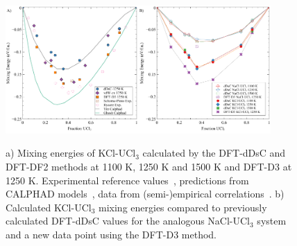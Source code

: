 \documentclass[preprint,3p,10pt,number,sort&compress]{elsarticle}
\begin{document}
\begin{figure}[h!]
\centering
\includegraphics[width=0.45\textwidth]{ben_fig2a.pdf}\includegraphics[width=0.45\textwidth]{ben_fig2b.pdf}
\caption{a) Mixing energies of KCl-UCl$_3$ calculated by the DFT-dDsC and DFT-DF2 methods at 1100 K, 1250 K and 1500 K and DFT-D3 at 1250 K. Experimental reference values~\cite{Rycerz}, predictions from CALPHAD models~\cite{YIN2020,Ghosh}, data from (semi-)empirical correlations~\cite{Pinto}. b) Calculated KCl-UCl$_3$ mixing energies compared to previously calculated DFT-dDsC values for the analogous NaCl-UCl$_3$ system~\cite{Andersson} and a new data point using the DFT-D3 method. }
\label{fig:KCl_UCl3_energy}
\end{figure}
\end{document}
